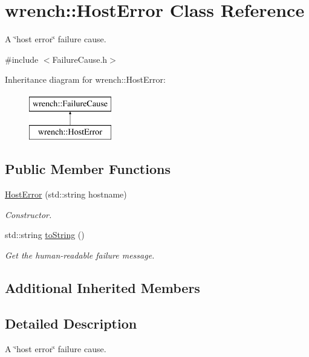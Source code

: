 \hypertarget{classwrench_1_1_host_error}{}\section{wrench\+:\+:Host\+Error Class Reference}
\label{classwrench_1_1_host_error}


A \char`\"{}host error\char`\"{} failure cause.  




{\ttfamily \#include $<$Failure\+Cause.\+h$>$}

Inheritance diagram for wrench\+:\+:Host\+Error\+:\begin{figure}[H]
\begin{center}
\leavevmode
\includegraphics[height=2.000000cm]{classwrench_1_1_host_error}
\end{center}
\end{figure}
\subsection*{Public Member Functions}
\begin{DoxyCompactItemize}
\item 
\hyperlink{classwrench_1_1_host_error_a9695b613a59279a9e6bc9ea16f673da4}{Host\+Error} (std\+::string hostname)
\begin{DoxyCompactList}\small\item\em Constructor. \end{DoxyCompactList}\item 
std\+::string \hyperlink{classwrench_1_1_host_error_adacb96198ee8477b67fcac9ff8638266}{to\+String} ()
\begin{DoxyCompactList}\small\item\em Get the human-\/readable failure message. \end{DoxyCompactList}\end{DoxyCompactItemize}
\subsection*{Additional Inherited Members}


\subsection{Detailed Description}
A \char`\"{}host error\char`\"{} failure cause. 

